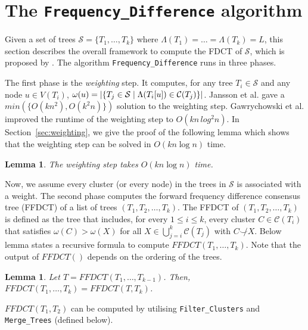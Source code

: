 \documentclass[final,1p,times]{elsarticle}
\newcommand{\compatible}{\smile}
\newcommand{\weight}{\omega}
\newtheorem{lemma}[theorem]{Lemma}
\begin{document}
    \section{The \texttt{Frequency\_Difference} algorithm}
    \label{sec_freq_diff_algo}

    Given a set of trees $\mathcal{S} = \{ T_1, \ldots, T_k \}$ where $\Lambda(T_1) = \ldots = \Lambda(T_k) = L$, this section describes the overall framework to compute the FDCT of $\mathcal{S}$, which is proposed by \cite{jansson2018algorithms}.
    The algorithm \texttt{Frequency\_Difference} runs in three phases. 
    
    The first phase is the \textit{weighting} step. It computes, for any tree $T_i \in \mathcal{S}$ and any node $u \in V(T_i)$, $\weight(u) = | \{ T_j \in {\cal S} \mid \Lambda(T_i[u]) \in \mathcal{C}(T_j) \} |$. Jansson et al. \cite{jansson2018algorithms} gave a $min(\{O(kn^2), O(k^2n)\})$ solution to the weighting step.
    Gawrychowski et al. \cite{gawrychowski2017faster} improved the runtime of the weighting step to $O(kn\,log^2n)$. In Section~\ref{sec:weighting}, we give the proof of the following lemma which shows that the weighting step can be solved in $O(k n \log n)$ time.
    
    \begin{lemma}
	    \label{lem-weighting-time}
	   The weighting step takes $O(kn \log n)$ time.
    \end{lemma}

    Now, we assume every cluster (or every node) in the trees in $\mathcal{S}$ is associated with a weight. The second phase computes the forward frequency difference consensus tree (FFDCT) of a list of trees $(T_1, T_2, \ldots, T_k)$.
    The FFDCT of $(T_1, T_2, \ldots, T_k)$ is defined as the tree that includes, for every $1 \leq i \leq k$, every cluster $C \in \mathcal{C}(T_i)$ that satisfies $\weight(C) > \weight(X)$ for all $X \in \bigcup_{j=i}^k \mathcal{C}(T_j)$ with $C \not\compatible X$. Below lemma states a recursive formula to compute $FFDCT(T_1, \ldots, T_k)$. Note that the output of $FFDCT()$ depends on the ordering of the trees.

    \begin{lemma} \label{lem-FFDCT} 
	    Let $T = FFDCT(T_1, \ldots, T_{k-1})$. Then, $FFDCT(T_1, \ldots, T_k) = FFDCT(T, T_k)$.
    \end{lemma}

    
    $FFDCT(T_1, T_2)$ can be computed by utilising \texttt{Filter\_Clusters} and \texttt{Merge\_Trees} (defined below).
\end{document}
